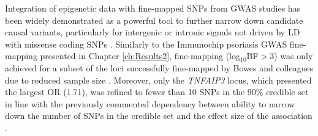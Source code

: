 Integration of epigenetic data with fine-mapped SNPs from GWAS studies has been widely demonstrated as a powerful tool to further narrow down candidate causal variants, particularly for intergenic or intronic signals not driven by LD with missense coding SNPs \parencite{Bunt2015,Farh2015}. Similarly to the Immunochip psoriasis GWAS fine-mapping presented in Chapter \ref{ch:Results2}, fine-mapping (log$_{10}$BF$>$3) was only achieved for a subset of the loci successfully fine-mapped by Bowes and colleagues due to reduced sample size \parencite{Bunt2015}. Moreover, only the \textit{TNFAIP3} locus, which presented the largest OR (1.71), was refined to fewer than 10 SNPs in the 90\% credible set in line with the previously commented dependency between ability to narrow down the number of SNPs in the credible set and the effect size of the association \parencite{Bunt2015}.

 
